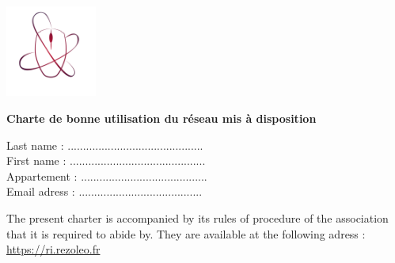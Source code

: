 \documentclass[12pt]{article}
\begin{document}
	
\thispagestyle{empty}

\begin{minipage}{0.15\linewidth}
	\includegraphics[height=3cm]{rezoleo.png}
\end{minipage}\hfill
\begin{minipage}{0.80\linewidth}
\LARGE \textbf{Charte de bonne utilisation du réseau mis à disposition}
\end{minipage}


\begin{flushright}
	Last name : ............................................\\
	First name : ............................................\\
	Appartement : .........................................\\
	Email adress : ........................................\\
\end{flushright}

\vspace*{0.5cm}
The present charter is accompanied by its rules of procedure of the association that it is required to abide by. They are available at the following adress : \url{https://ri.rezoleo.fr}

\vspace*{0.5cm}
\end{document}
